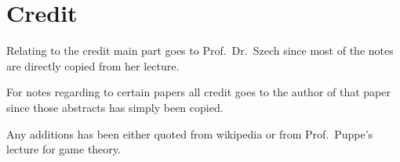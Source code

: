 

\chapter*{Credit}

Relating to the credit main part goes to Prof.~Dr.~Szech since most of the notes are directly copied from her lecture. 

For notes regarding to certain papers all credit goes to the author of that paper since those abstracts has simply been copied.

Any additions has been either quoted from wikipedia or from Prof.~Puppe's lecture for game theory.
